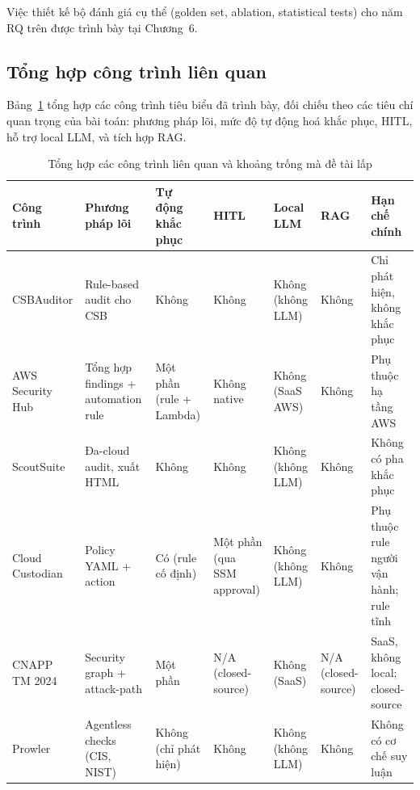 Việc thiết kế bộ đánh giá cụ thể (golden set, ablation, statistical tests) cho năm RQ trên được trình bày tại Chương~6.

\subsection{Tổng hợp công trình liên quan}
\label{subsec:rw-synthesis}

Bảng~\ref{tab:related-work} tổng hợp các công trình tiêu biểu đã trình bày, đối chiếu theo các tiêu chí quan trọng của bài toán: phương pháp lõi, mức độ tự động hoá khắc phục, HITL, hỗ trợ local LLM, và tích hợp RAG.

\begin{table}[!htb]
  \centering
  \caption{Tổng hợp các công trình liên quan và khoảng trống mà đề tài lấp}
  \label{tab:related-work}
  \renewcommand{\arraystretch}{1.3}
  \setlength{\tabcolsep}{4pt}
  \footnotesize
  \begin{tabular}{|p{2.6cm}|p{2.6cm}|>{\centering\arraybackslash}p{1.4cm}|>{\centering\arraybackslash}p{0.9cm}|>{\centering\arraybackslash}p{1.0cm}|>{\centering\arraybackslash}p{0.9cm}|p{3.0cm}|}
    \hline
    \textbf{Công trình} & \textbf{Phương pháp lõi} & \textbf{Tự động khắc phục} & \textbf{HITL} & \textbf{Local LLM} & \textbf{RAG} & \textbf{Hạn chế chính} \\ \hline
    CSBAuditor \cite{torkura2019csbauditor} & Rule-based audit cho CSB & Không & Không & Không (không LLM) & Không & Chỉ phát hiện, không khắc phục \\ \hline
    AWS Security Hub \cite{aws_securityhub} & Tổng hợp findings + automation rule & Một phần (rule + Lambda) & Không native & Không (SaaS AWS) & Không & Phụ thuộc hạ tầng AWS \\ \hline
    ScoutSuite \cite{scoutsuite} & Đa-cloud audit, xuất HTML & Không & Không & Không (không LLM) & Không & Không có pha khắc phục \\ \hline
    Cloud Custodian \cite{cloudcustodian} & Policy YAML + action & Có (rule cố định) & Một phần (qua SSM approval) & Không (không LLM) & Không & Phụ thuộc rule người vận hành; rule tĩnh \\ \hline
    CNAPP TM 2024 \cite{gartner_cnapp_2024} & Security graph + attack-path & Một phần & N/A (closed-source) & Không (SaaS) & N/A (closed-source) & SaaS, không local; closed-source \\ \hline
    Prowler \cite{prowler} & Agentless checks (CIS, NIST) & Không (chỉ phát hiện) & Không & Không (không LLM) & Không & Không có cơ chế suy luận \\ \hline

\end{tabular}
\end{table}
